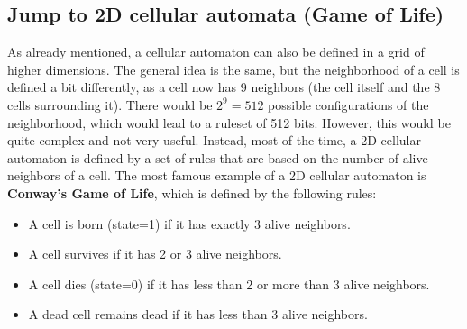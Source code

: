 \documentclass[a4paper,12pt]{llncs}
\numberwithin{equation}{section}
\begin{document}
\subsection{Jump to 2D cellular automata (Game of Life)}
As already mentioned, a cellular automaton can also be defined in a grid of higher dimensions.
The general idea is the same, but the neighborhood of a cell is defined a bit differently, as a cell now has 9 neighbors (the cell itself and the 8 cells surrounding it).
There would be $2^9=512$ possible configurations of the neighborhood, which would lead to a ruleset of 512 bits.
However, this would be quite complex and not very useful.
Instead, most of the time, a 2D cellular automaton is defined by a set of rules that are based on the number of alive neighbors of a cell.
The most famous example of a 2D cellular automaton is \textbf{Conway's Game of Life}, which is defined by the following rules:
\begin{itemize}
  \item A cell is born (state=1) if it has exactly 3 alive neighbors.
  \item A cell survives if it has 2 or 3 alive neighbors.
  \item A cell dies (state=0) if it has less than 2 or more than 3 alive neighbors.
  \item A dead cell remains dead if it has less than 3 alive neighbors.
\end{itemize}
\end{document}
